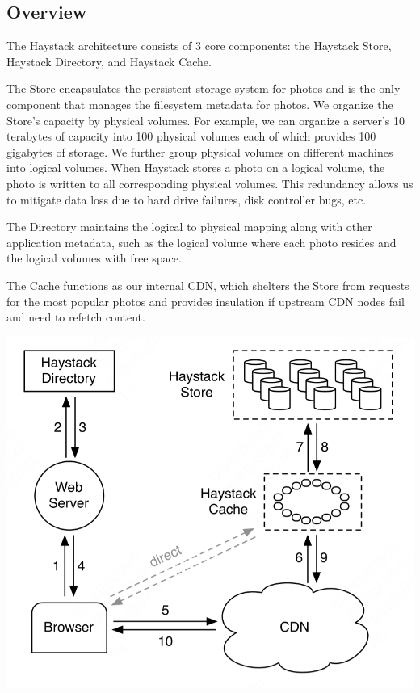 \documentclass[11pt]{article}
\begin{document}
\subsection{Overview}
\label{sec:orgfae61f3}
The Haystack architecture consists of 3 core components: the Haystack Store, Haystack Directory, and
Haystack Cache.

The Store encapsulates the persistent storage system for photos and is the only component that manages
the filesystem metadata for photos. We organize the Store’s capacity by physical volumes. For example,
we can organize a server’s 10 terabytes of capacity into 100 physical volumes each of which provides
100 gigabytes of storage. We further group physical volumes on different machines into logical
volumes. When Haystack stores a photo on a logical volume, the photo is written to all corresponding
physical volumes. This redundancy allows us to mitigate data loss due to hard drive failures, disk
controller bugs, etc.

The Directory maintains the logical to physical mapping along with other application metadata, such as
the logical volume where each photo resides and the logical volumes with free space.

The Cache functions as our internal CDN, which shelters the Store from requests for the most popular
photos and provides insulation if upstream CDN nodes fail and need to refetch content.

\begin{center}
\includegraphics[width=.8\textwidth]{../../images/papers/134.png}
\end{center}
\end{document}
